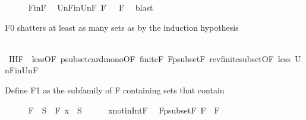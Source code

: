 \begin{isabellebody}
\isanewline
\ \ \ \ \isamarkupfalse%
\ F{}{\isacharunderscore}{\kern0pt}in{\isacharunderscore}{\kern0pt}F\ \isamarkupfalse%
\ Un{\isacharunderscore}{\kern0pt}F{}{\isacharunderscore}{\kern0pt}in{\isacharunderscore}{\kern0pt}Un{\isacharunderscore}{\kern0pt}F{\isacharcolon}{\kern0pt}{\isachardoublequoteopen}{\isasymUnion}\ {\isacharquery}{\kern0pt}F{}\ {\isasymsubseteq}\ {\isasymUnion}\ F{\isachardoublequoteclose}\ \isamarkupfalse%
\ blast%
\begin{isamarkuptext}%
F0 shatters at least as many sets as  by the induction hypothesis%
\end{isamarkuptext}\isamarkuptrue%
\ \ \ \ \isamarkupfalse%
\ IH{\isacharunderscore}{\kern0pt}F{}\ {\isacharequal}{\kern0pt}\ less{\isacharparenleft}{\kern0pt}{}{\isacharparenright}{\kern0pt}{\isacharbrackleft}{\kern0pt}OF\ psubset{\isacharunderscore}{\kern0pt}card{\isacharunderscore}{\kern0pt}mono{\isacharbrackleft}{\kern0pt}OF\ finite{\isacharunderscore}{\kern0pt}F\ F{}{\isacharunderscore}{\kern0pt}psubset{\isacharunderscore}{\kern0pt}F{\isacharbrackright}{\kern0pt}\ rev{\isacharunderscore}{\kern0pt}finite{\isacharunderscore}{\kern0pt}subset{\isacharbrackleft}{\kern0pt}OF\ less{\isacharparenleft}{\kern0pt}{}{\isacharparenright}{\kern0pt}\ Un{\isacharunderscore}{\kern0pt}F{}{\isacharunderscore}{\kern0pt}in{\isacharunderscore}{\kern0pt}Un{\isacharunderscore}{\kern0pt}F{\isacharbrackright}{\kern0pt}{\isacharbrackright}{\kern0pt}%
\begin{isamarkuptext}%
Define F1 as the subfamily of F containing sets that contain %
\end{isamarkuptext}\isamarkuptrue%
\ \ \ \ \isamarkupfalse%
\ {\isacharquery}{\kern0pt}F{}\ {\isacharequal}{\kern0pt}\ {\isachardoublequoteopen}{\isacharbraceleft}{\kern0pt}S\ {\isasymin}\ F{\isachardot}{\kern0pt}\ x\ {\isasymin}\ S{\isacharbraceright}{\kern0pt}{\isachardoublequoteclose}\isanewline
\ \ \ \ \isamarkupfalse%
\ x{\isacharunderscore}{\kern0pt}not{\isacharunderscore}{\kern0pt}in{\isacharunderscore}{\kern0pt}Int{\isacharunderscore}{\kern0pt}F\ \isamarkupfalse%
\ F{}{\isacharunderscore}{\kern0pt}psubset{\isacharunderscore}{\kern0pt}F{\isacharcolon}{\kern0pt}\ {\isachardoublequoteopen}{\isacharquery}{\kern0pt}F{}\ {\isasymsubset}\ F{\isachardoublequoteclose}\ \isamarkupfalse%

\end{isabellebody}
